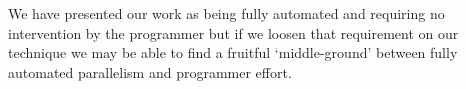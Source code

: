 We have presented our work as being fully automated and requiring no
intervention by the programmer but if we loosen that requirement on
our technique we may be able to find a fruitful `middle-ground' between
fully automated parallelism and programmer effort.
